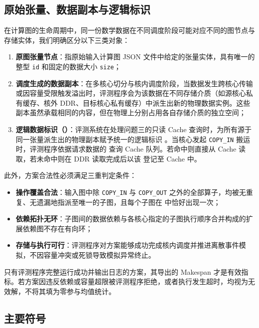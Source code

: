 \documentclass[anonymous,notoc]{gmcm2026}
\providecommand{\tightlist}{\setlength{\itemsep}{0pt}\setlength{\parskip}{0pt}}
\begin{document}
\subsection{原始张量、数据副本与逻辑标识}

在计算图的生命周期中，同一份数学数据在不同调度阶段可能对应不同的图节点与存储实体，我们明确区分以下三类对象：

\begin{enumerate}
\def\labelenumi{\arabic{enumi}.}
\tightlist
\item
  \textbf{原图张量节点}：指原始输入计算图 JSON 文件中给定的张量实体，具有唯一的整型 \texttt{id} 和固定的数据大小 \texttt{size}；
\item
  \textbf{调度生成的数据副本}：在多核心切分与核内调度阶段，当数据发生跨核心传输或因容量受限触发溢出时，评测程序会为该数据在不同存储介质（如源核心私有缓存、核外 DDR、目标核心私有缓存）中派生出新的物理数据实例。这些副本虽然承载相同的内容，但在物理上分别占用各自存储介质的独立空间；
\item
  \textbf{逻辑数据标识（\texttt{}）}：评测系统在处理问题三的只读 Cache 查询时，为所有源于同一张量派生出的物理副本赋予统一的逻辑标识 \texttt{}。当核心发起 \texttt{COPY\_IN} 搬运时，评测程序依据请求数据的 \texttt{} 查询 Cache 队列。若命中则直接从 Cache 读取，若未命中则在 DDR 读取完成后以该 \texttt{} 登记至 Cache 中。
\end{enumerate}

此外，方案合法性必须满足三重判定条件：

\begin{itemize}
\tightlist
\item
  \textbf{操作覆盖合法}：输入图中除 \texttt{COPY\_IN} 与 \texttt{COPY\_OUT} 之外的全部算子，均被无重复、无遗漏地指派至唯一的子图，且每个子图在 \texttt{} 中恰好出现一次；
\item
  \textbf{依赖拓扑无环}：子图间的数据依赖与各核心指定的子图执行顺序合并构成的扩展依赖图不存在有向环；
\item
  \textbf{存储与执行可行}：评测程序对方案能够成功完成核内调度并推进离散事件模拟，不因容量冲突或死锁导致模拟异常终止。
\end{itemize}

只有评测程序完整运行成功并输出日志的方案，其导出的 Makespan 才是有效指标。若方案因违反依赖或容量超限被评测程序拒绝，或者执行发生超时，均视为无效解，不将其填为零参与均值统计。

\subsection{主要符号}
\end{document}
